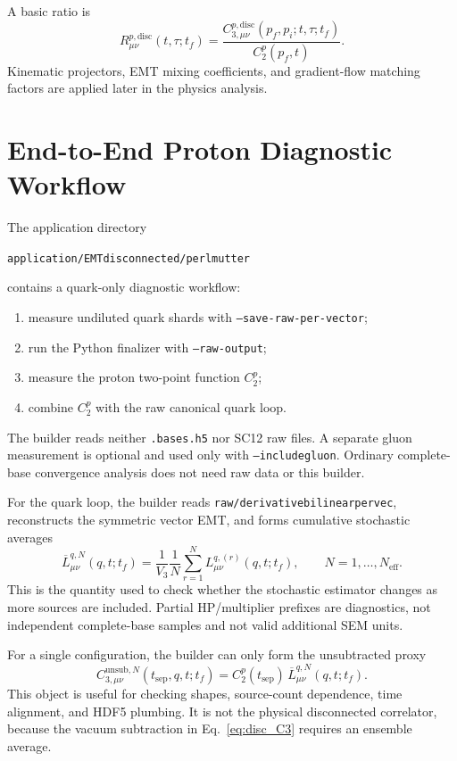 \documentclass[11pt,a4paper]{article}
\newcommand{\code}[1]{\texttt{\begingroup\def\_{\textunderscore\allowbreak}#1\endgroup}}
\newcommand{\Vthree}{V_3}
\newcommand{\Tf}{t_f}
\begin{document}
A basic ratio is
\begin{equation}
  R^{p,\mathrm{disc}}_{\mu\nu}(t,\tau;\Tf)
  =
  \frac{
    C^{p,\mathrm{disc}}_{3,\mu\nu}(p_f,p_i;t,\tau;\Tf)
  }{
    C_2^p(p_f,t)
  }.
  \label{eq:disc_ratio}
\end{equation}
Kinematic projectors, EMT mixing coefficients, and gradient-flow matching
factors are applied later in the physics analysis.

\section{End-to-End Proton Diagnostic Workflow}

The application directory
\begin{center}
  \code{application/EMT\_disconnected\_1pt/perlmutter}
\end{center}
contains a quark-only diagnostic workflow:
\begin{enumerate}
  \item measure undiluted quark shards with \code{--save-raw-per-vector};
  \item run the Python finalizer with \code{--raw-output};
  \item measure the proton two-point function \(C_2^p\);
  \item combine \(C_2^p\) with the raw canonical quark loop.
\end{enumerate}
The builder reads neither \code{.bases.h5} nor SC12 raw files. A separate gluon
measurement is optional and used only with \code{--include\_gluon}. Ordinary
complete-base convergence analysis does not need raw data or this builder.

For the quark loop, the builder reads
\code{raw/derivative\_bilinear\_pervec}, reconstructs the symmetric vector EMT,
and forms
cumulative stochastic averages
\begin{equation}
  \overline{L}^{q,N}_{\mu\nu}(q,t;\Tf)
  =
  \frac{1}{\Vthree}
  \frac{1}{N}
  \sum_{r=1}^{N}
  L^{q,(r)}_{\mu\nu}(q,t;\Tf),
  \qquad
  N=1,\ldots,N_{\mathrm{eff}}.
  \label{eq:cumulative_loop}
\end{equation}
This is the quantity used to check whether the stochastic estimator changes
as more sources are included. Partial HP/multiplier prefixes are diagnostics,
not independent complete-base samples and not valid additional SEM units.

For a single configuration, the builder can only form the unsubtracted proxy
\begin{equation}
  C^{\mathrm{unsub},N}_{3,\mu\nu}
  (t_{\mathrm{sep}},q,t;\Tf)
  =
  C_2^p(t_{\mathrm{sep}})\,
  \overline{L}^{q,N}_{\mu\nu}(q,t;\Tf).
  \label{eq:single_cfg_proxy}
\end{equation}
This object is useful for checking shapes, source-count dependence, time
alignment, and HDF5 plumbing.  It is not the physical disconnected correlator,
because the vacuum subtraction in Eq.~\eqref{eq:disc_C3} requires an ensemble
average.
\end{document}
